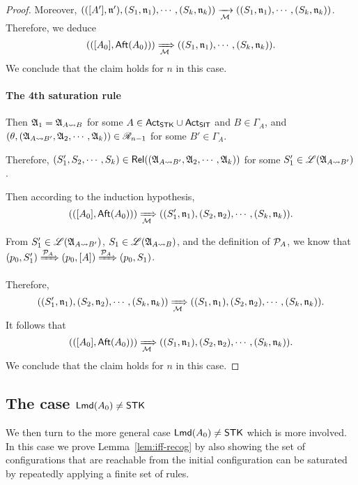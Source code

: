 \begin{proof}
Moreover, $(([A'], \mathfrak{n}'), (S_1, \mathfrak{n}_1), \cdots, (S_k, \mathfrak{n}_k)) \xrightarrow[{\mathcal{M} }]{} ((S_1, \mathfrak{n}_1), \cdots, (S_k, \mathfrak{n}_k))$. Therefore, we deduce 
$$(([A_0], {\sf Aft}(A_0))) \xRightarrow[{\mathcal{M} }]{} ((S_1, \mathfrak{n}_1), \cdots, (S_k, \mathfrak{n}_k)).$$ 
We conclude that the claim holds for $n$ in this case. 

\paragraph*{The 4th saturation rule} Then ${\mathfrak{A} }_1 = {\mathfrak{A} }_{A\rightsquigarrow B}$ for some $A \in {\sf Act}_{\sf STK} \cup {\sf Act}_{\sf SIT}$ and $B \in \Gamma_A$,  and $(\theta, ({\mathfrak{A} }_{A\rightsquigarrow B'}, {\mathfrak{A} }_2, \cdots, {\mathfrak{A} }_k)) \in \mathscr{R}_{n-1}$ for  some $B' \in \Gamma_A$. 

Therefore, $(S'_1, S_2, \cdots, S_k) \in \mathsf{Rel}(({\mathfrak{A} }_{A\rightsquigarrow B'}, {\mathfrak{A} }_2, \cdots, {\mathfrak{A} }_k))$ for some $S'_1 \in {\mathscr{L} }({\mathfrak{A} }_{A\rightsquigarrow B'})$. 

Then according to the induction hypothesis, 
$$(([A_0], {\sf Aft}(A_0))) \xRightarrow[{\mathcal{M} }]{} ((S'_1, \mathfrak{n}_1), (S_2, \mathfrak{n}_2), \cdots, (S_k, \mathfrak{n}_k)).$$

From $S'_1 \in {\mathscr{L} }({\mathfrak{A} }_{A\rightsquigarrow B'})$, $S_1 \in {\mathscr{L} }({\mathfrak{A} }_{A\rightsquigarrow B})$, and the definition of ${\mathcal{P} }_A$, we know that $(p_0, S'_1) \xRightarrow{{\mathcal{P} }_A} (p_0, [A]) \xRightarrow{{\mathcal{P} }_A} (p_0, S_1)$. 

Therefore, 
$$((S'_1, \mathfrak{n}_1), (S_2, \mathfrak{n}_2), \cdots, (S_k, \mathfrak{n}_k)) \xRightarrow[{\mathcal{M} }]{} ((S_1, \mathfrak{n}_1), (S_2, \mathfrak{n}_2), \cdots, (S_k, \mathfrak{n}_k)).$$
It follows that 
$$(([A_0], {\sf Aft}(A_0))) \xRightarrow[{\mathcal{M} }]{} ((S_1, \mathfrak{n}_1), (S_2, \mathfrak{n}_2), \cdots, (S_k, \mathfrak{n}_k)).$$
We conclude that the claim holds for $n$ in this case. 
\end{proof}



\subsection{The case ${\sf Lmd}(A_0) \neq \mathsf{STK}$}\label{sec:lmamass-nostk}
%
We then turn to the more general case ${\sf Lmd}(A_0)\neq\mathsf{STK}$ which is more involved. In this case we prove Lemma~\ref{lem:iff-recog} by also showing the set of configurations that are reachable from the initial configuration can be saturated by repeatedly applying a finite set of rules.

